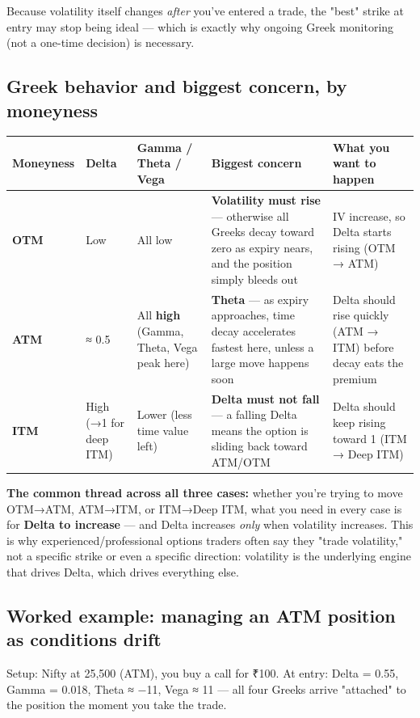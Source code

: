 \documentclass[12pt,openany]{book}
\theoremstyle{definition}
\theoremstyle{remark}
\begin{document}
Because volatility itself changes \emph{after} you've entered a trade, the "best" strike at entry may stop being ideal — which is exactly why ongoing Greek monitoring (not a one-time decision) is necessary.

\subsection{Greek behavior and biggest concern, by moneyness}

{\small
\begin{longtable}{@{}L{0.14\textwidth}L{0.20\textwidth}L{0.18\textwidth}L{0.18\textwidth}L{0.18\textwidth}@{}}
\toprule
\textbf{Moneyness} & \textbf{Delta} & \textbf{Gamma / Theta / Vega} & \textbf{Biggest concern} & \textbf{What you want to happen} \\
\midrule
\textbf{OTM} & Low & All low & \textbf{Volatility must rise} — otherwise all Greeks decay toward zero as expiry nears, and the position simply bleeds out & IV increase, so Delta starts rising (OTM → ATM) \\
\textbf{ATM} & ≈ 0.5 & All \textbf{high} (Gamma, Theta, Vega peak here) & \textbf{Theta} — as expiry approaches, time decay accelerates fastest here, unless a large move happens soon & Delta should rise quickly (ATM → ITM) before decay eats the premium \\
\textbf{ITM} & High (→1 for deep ITM) & Lower (less time value left) & \textbf{Delta must not fall} — a falling Delta means the option is sliding back toward ATM/OTM & Delta should keep rising toward 1 (ITM → Deep ITM) \\
\bottomrule
\end{longtable}
}

\textbf{The common thread across all three cases:} whether you're trying to move OTM→ATM, ATM→ITM, or ITM→Deep ITM, what you need in every case is for \textbf{Delta to increase} — and Delta increases \emph{only} when volatility increases. This is why experienced/professional options traders often say they "trade volatility," not a specific strike or even a specific direction: volatility is the underlying engine that drives Delta, which drives everything else.

\subsection{Worked example: managing an ATM position as conditions drift}

Setup: Nifty at 25,500 (ATM), you buy a call for ₹100. At entry: Delta = 0.55, Gamma = 0.018, Theta ≈ −11, Vega ≈ 11 — all four Greeks arrive "attached" to the position the moment you take the trade.
\end{document}
